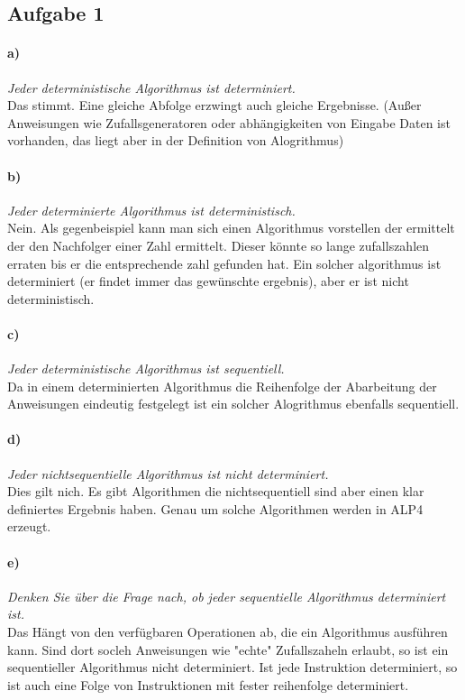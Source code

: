 \subsection*{Aufgabe 1}

\paragraph{a)} \textit{Jeder deterministische Algorithmus ist determiniert.}
\\
Das stimmt. Eine gleiche Abfolge erzwingt auch gleiche Ergebnisse. (Außer Anweisungen wie Zufallsgeneratoren oder abhängigkeiten von Eingabe Daten ist vorhanden, das liegt aber in der Definition von Alogrithmus)

\paragraph{b)} \textit{Jeder determinierte Algorithmus ist deterministisch.}
\\
Nein. Als gegenbeispiel kann man sich einen Algorithmus vorstellen der ermittelt der den Nachfolger einer Zahl ermittelt. Dieser könnte so lange zufallszahlen erraten bis er die entsprechende zahl gefunden hat. Ein solcher algorithmus ist determiniert (er findet immer das gewünschte ergebnis), aber er ist nicht deterministisch.

\paragraph{c)} \textit{Jeder deterministische Algorithmus ist sequentiell.}
\\
Da in einem determinierten Algorithmus die  Reihenfolge der Abarbeitung der Anweisungen eindeutig festgelegt ist ein solcher Alogrithmus ebenfalls sequentiell.

\paragraph{d)} \textit{Jeder nichtsequentielle Algorithmus ist nicht determiniert.}
\\
Dies gilt nich. Es gibt Algorithmen die nichtsequentiell sind aber einen klar definiertes Ergebnis haben. Genau um solche Algorithmen werden in ALP4 erzeugt.

\paragraph{e)} \textit{Denken Sie über die Frage nach, ob jeder sequentielle Algorithmus determiniert ist.}
\\
Das Hängt von den verfügbaren Operationen ab, die ein Algorithmus ausführen kann. Sind dort socleh Anweisungen wie "echte" Zufallszaheln erlaubt, so ist ein sequentieller Algorithmus nicht determiniert. Ist jede Instruktion determiniert, so ist auch eine Folge von Instruktionen mit fester reihenfolge determiniert.